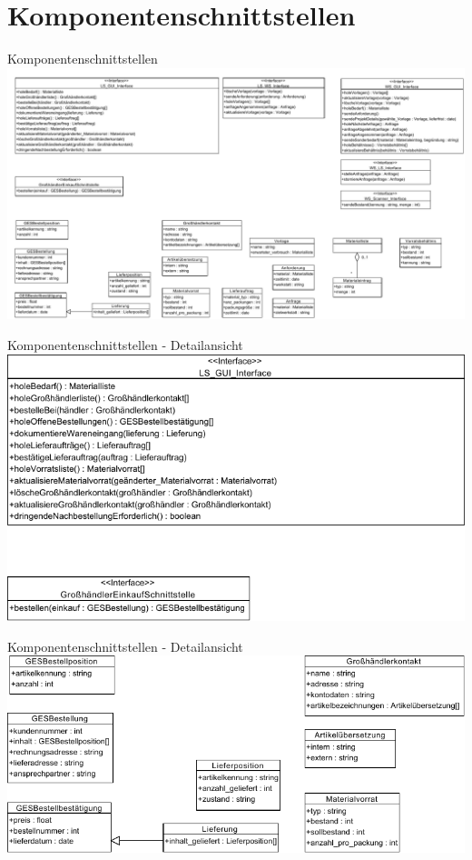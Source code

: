 \documentclass{beamer}
\begin{document}
	\section{Komponentenschnittstellen}
	\begin{frame}{Komponentenschnittstellen}
		\includegraphics[width=\textwidth]{PDF/Schnittstellen.pdf}
	\end{frame}
\begin{frame}{Komponentenschnittstellen - Detailansicht}
\includegraphics[height=0.75\textheight]{PDF/Schnittstellen_links_oben.pdf}
\end{frame}
\begin{frame}{Komponentenschnittstellen - Detailansicht}
\includegraphics[width=\textwidth]{PDF/Schnittstellen_links_unten.pdf}
\end{frame}
\end{document}
